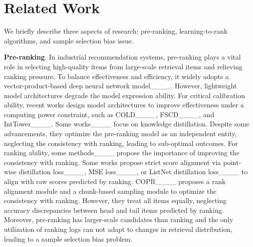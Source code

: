 \section{Related Work}
We briefly describe three aspects of research: pre-ranking, learning-to-rank algorithms, and sample selection bias issue.

\textbf{Pre-ranking}.
In industrial recommendation systems, pre-ranking plays a vital role in selecting high-quality items from large-scale retrieval items and relieving ranking pressure.
To balance effectiveness and efficiency, it widely adopts a vector-product-based deep neural network model____.
However, lightweight model architectures degrade the model expression ability. 
For critical calibration ability, recent works design model architectures to improve effectiveness under a computing power constraint, such as COLD____, FSCD____, and IntTower____.
Some works____ focus on knowledge distillation. 
Despite some advancements, they optimize the pre-ranking model as an independent entity, neglecting the consistency with ranking, leading to sub-optimal outcomes.
For ranking ability, some  methods____ propose the importance of improving the consistency with ranking.
Some works propose strict score alignment via point-wise distillation loss____, MSE loss____, or ListNet distillation loss____ to align with raw scores predicted by ranking. 
COPR____ proposes a rank alignment module and a chunk-based sampling module to optimize the consistency with ranking. 
However, they treat all items equally, neglecting accuracy discrepancies between head and tail items predicted by ranking.
Moreover, pre-ranking has larger-scale candidates than ranking and the only utilization of ranking logs can not adapt to changes in retrieval distribution, leading to a sample selection bias problem.

